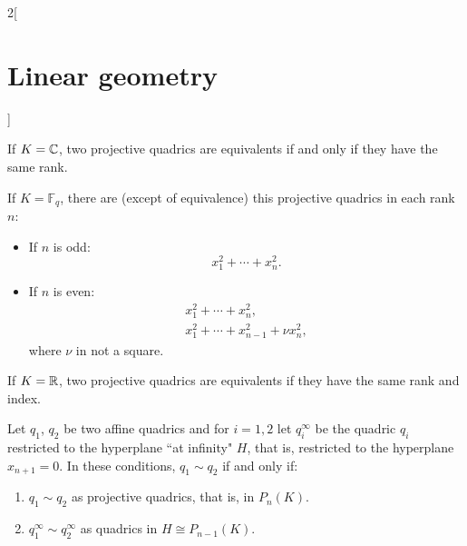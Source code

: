 \documentclass[../../../main.tex]{subfiles}
\begin{document}
\begin{multicols}{2}[\section{Linear geometry}]
  \begin{theorem}
    If $K=\mathbb{C} $, two projective quadrics are equivalents if and only if they have the same rank.
  \end{theorem}
  \begin{theorem}
    If $K=\mathbb{F}_q$, there are (except of equivalence) this projective quadrics in each rank $n$:
    \begin{itemize}
      \item If $n$ is odd: $$\displaystyle x_1^2+\cdots+ x_n^2.$$
      \item If $n$ is even: \begin{gather*}
              x_1^2+\cdots+ x_n^2,\\
              x_1^2+\cdots+ x_{n-1}^2+\nu x_n^2,
            \end{gather*}
            where $\nu$ in not a square.
    \end{itemize}
  \end{theorem}
  \begin{theorem}
    If $K=\mathbb{R} $, two projective quadrics are equivalents if they have the same rank and index.
  \end{theorem}
  \begin{theorem}
    Let $q_1$, $q_2$ be two affine quadrics and for $i=1,2$ let $q_i^\infty$ be the quadric $q_i$ restricted to the hyperplane ``at infinity" $H$, that is, restricted to the hyperplane $x_{n+1}=0$. In these conditions, $q_1\sim q_2$ if and only if:
    \begin{enumerate}
      \item $q_1\sim q_2$ as projective quadrics, that is, in $P_n(K)$.
      \item $q_1^\infty\sim q_2^\infty$ as quadrics in $H\cong P_{n-1}(K)$.
    \end{enumerate}
  \end{theorem}
\end{multicols}
\end{document}
